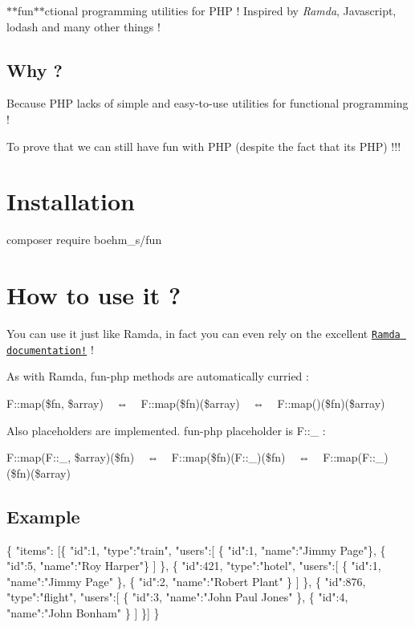 $\ast$$\ast$fun$\ast$$\ast$ctional programming utilities for P\+HP ! Inspired by {\itshape Ramda}, Javascript, lodash and many other things !

\subsection*{Why ?}


\begin{DoxyItemize}
\item Because P\+HP lacks of simple and easy-\/to-\/use utilities for functional programming !
\item To prove that we can still have fun with P\+HP (despite the fact that it\textquotesingle{}s P\+HP) !!!
\end{DoxyItemize}

\section*{Installation}


\begin{DoxyCode}
composer require boehm\_s/fun
\end{DoxyCode}


\section*{How to use it ?}

You can use it just like Ramda, in fact you can even rely on the excellent \href{https://ramdajs.com/docs/}{\tt Ramda documentation!} !

As with Ramda, fun-\/php methods are automatically curried \+:

{\ttfamily F\+::map(\$fn, \$array)} ~ ⇔ ~ {\ttfamily F\+::map(\$fn)(\$array)} ~ ⇔ ~ {\ttfamily F\+::map()(\$fn)(\$array)}

Also placeholders are implemented. fun-\/php placeholder is {\ttfamily F\+::\+\_\+} \+:

{\ttfamily F\+::map(F\+::\+\_\+, \$array)(\$fn)} ~ ⇔ ~ {\ttfamily F\+::map(\$fn)(F\+::\+\_\+)(\$fn)} ~ ⇔ ~ {\ttfamily F\+::map(\+F\+::\+\_\+)(\$fn)(\$array)}

\subsection*{Example}


\begin{DoxyCode}
\{
  "items": [\{
      "id":1,
      "type":"train",
      "users":[
        \{ "id":1, "name":"Jimmy Page"\},
        \{ "id":5, "name":"Roy Harper"\}
      ]
    \}, \{
      "id":421,
      "type":"hotel",
      "users":[
        \{ "id":1, "name":"Jimmy Page" \}, 
        \{ "id":2, "name":"Robert Plant" \}
      ]
    \}, \{
      "id":876,
      "type":"flight",
      "users":[
        \{ "id":3, "name":"John Paul Jones" \},
        \{ "id":4, "name":"John Bonham" \}
      ]
    \}]
\}
\end{DoxyCode}


